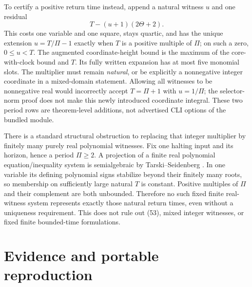\documentclass[11pt,a4paper]{article}
\numberwithin{equation}{section}
\begin{document}
To certify a positive return time instead, append a natural witness $u$ and
one residual
\[
                         T-(u+1)(2\Theta+2).                      \tag{54}
\]
This costs one variable and one square, stays quartic, and has the unique
extension $u=T/\Pi-1$ exactly when $T$ is a positive multiple of $\Pi$;
on such a zero, $0\le u<T$. The augmented coordinate-height bound is the
maximum of the core-with-clock bound and $T$.
Its fully written expansion has at most five monomial slots. The multiplier
must remain \emph{natural}, or be explicitly a nonnegative integer coordinate in a
mixed-domain statement. Allowing all witnesses to be nonnegative real would
incorrectly accept $T=\Pi+1$ with $u=1/\Pi$; the selector-norm proof does not
make this newly introduced coordinate integral. These two period rows are
theorem-level additions, not advertised CLI options of the bundled module.

There is a standard structural obstruction to replacing that integer
multiplier by finitely many purely real polynomial witnesses. Fix one
halting input and its horizon, hence a period $\Pi\ge2$. A projection of a
finite real polynomial equation/inequality system is semialgebraic by
Tarski--Seidenberg \cite[Theorem 2.1]{fpa:basu}. In one variable its defining
polynomial signs stabilize beyond their finitely many roots, so membership
on sufficiently large natural $T$ is constant. Positive multiples of $\Pi$
and their complement are both unbounded. Therefore no such fixed finite
real-witness system represents exactly those natural return times, even
without a uniqueness requirement. This does not rule out (53), mixed integer
witnesses, or fixed finite bounded-time formulations.
\section{Evidence and portable reproduction}\label{fpa:ls:sec:evidence}
\end{document}

